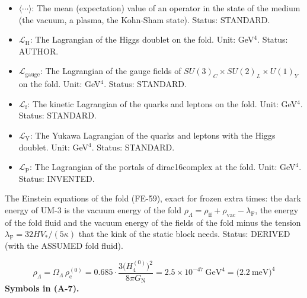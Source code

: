 \documentclass[
  10pt,
]{article}
\begin{document}
\begin{itemize}
  \(\mathsf{A}_1\): The time derivative of \(\mathsf{A}\) in units of
  \(H\), \(\mathsf{A}_1 = \mathsf{A}'/H = a_4''/H^2\). Unit:
  dimensionless. Status: DERIVED.
\item
  \(\langle\cdots\rangle\): The mean (expectation) value of an operator
  in the state of the medium (the vacuum, a plasma, the Kohn-Sham
  state). Status: STANDARD.
\item
  \(\mathcal{L}_{\mathrm{H}}\): The Lagrangian of the Higgs doublet on
  the fold. Unit: GeV\(^4\). Status: AUTHOR.
\item
  \(\mathcal{L}_{\mathrm{gauge}}\): The Lagrangian of the gauge fields
  of \(SU(3)_C\times SU(2)_L\times U(1)_Y\) on the fold. Unit:
  GeV\(^4\). Status: STANDARD.
\item
  \(\mathcal{L}_{\mathrm{f}}\): The kinetic Lagrangian of the quarks and
  leptons on the fold. Unit: GeV\(^4\). Status: STANDARD.
\item
  \(\mathcal{L}_{\mathrm{Y}}\): The Yukawa Lagrangian of the quarks and
  leptons with the Higgs doublet. Unit: GeV\(^4\). Status: STANDARD.
\item
  \(\mathcal{L}_{\mathrm{P}}\): The Lagrangian of the portals of
  dirac16complex at the fold. Unit: GeV\(^4\). Status: INVENTED.
\end{itemize}

The Einstein equations of the fold (FE-59), exact for frozen extra
times: the dark energy of UM-3 is the vacuum energy of the fold
\(\rho_\Lambda = \rho_{\mathrm{ff}} + \rho_{\mathrm{vac}} - \lambda_{\mathrm{F}}\),
the energy of the fold fluid and the vacuum energy of the fields of the
fold minus the tension \(\lambda_{\mathrm{F}} = 32HV_*/(5\kappa)\) that
the kink of the static block needs. Status: DERIVED (with the ASSUMED
fold fluid).

\[
\rho_\Lambda = \Omega_\Lambda\,\rho_{\mathrm{c}}^{(0)} = 0.685\cdot\frac{3\big(H_4^{(0)}\big)^2}{8\pi G_{\mathrm{N}}} = 2.5\times10^{-47}\ \text{GeV}^4 = \big(2.2\ \text{meV}\big)^4 \tag{A-7}
\] \textbf{Symbols in (A-7).}
\end{document}
